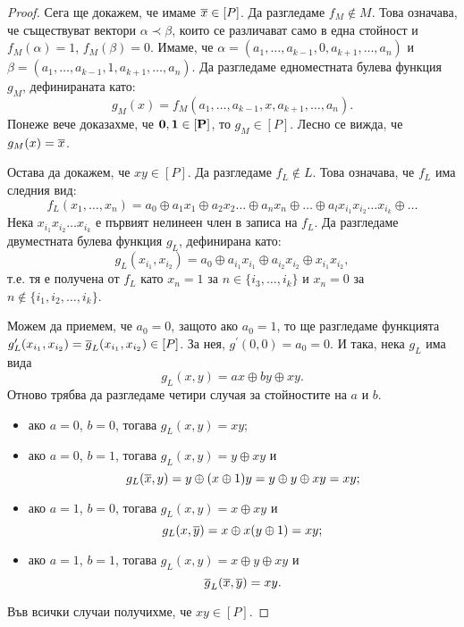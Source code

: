 \begin{proof}
  Сега ще докажем, че имаме $\overline{x} \in [P]$.
  Да разгледаме $f_M \not\in M$. Това означава, че съществуват вектори $\alpha  \prec \beta$, които се различават
  само в една стойност и $f_M(\alpha) = 1$, $f_M(\beta) = 0$.
  Имаме, че  $\alpha = (a_1,\dots,a_{k-1},0,a_{k+1},\dots,a_n)$ и $\beta = (a_1,\dots,a_{k-1},1,a_{k+1},\dots,a_n)$.
  Да разгледаме едноместната булева функция $g_M$, дефинираната като:
  \[g_M(x) = f_M(a_1,\dots,a_{k-1},x,a_{k+1},\dots,a_n).\]
  Понеже вече доказахме, че ${\bf 0},\bf{1} \in [P]$, то $g_M \in [P]$.
  Лесно се вижда, че $g_M(x) = \overline{x}$. 

  Остава да докажем, че $xy \in [P]$.
  Да разгледаме $f_L \not\in L$. Това означава, че $f_L$ има следния вид:
  \[f_L(x_1,\dots,x_n) = a_0 \oplus a_1x_1\oplus a_2x_2 \dots\oplus a_n x_n\oplus \dots \oplus a_lx_{i_1}x_{i_2}\dots x_{i_k}\oplus\dots \]
  Нека $x_{i_1}x_{i_2}\dots x_{i_k}$ е първият нелинеен член в записа на $f_L$.
  Да разгледаме двуместната булева функция $g_L$, дефинирана като:
  \[g_L(x_{i_1},x_{i_2}) = a_0 \oplus a_{i_1}x_{i_1} \oplus a_{i_2}x_{i_2} \oplus x_{i_1}x_{i_2},\]
  т.е. тя е получена от $f_L$ като $x_{n} = 1$ за $n \in \{i_3,\dots,i_k\}$ и $x_n = 0$ за $n \not\in\{i_1,i_2,\dots,i_k\}$.
  
  Можем да приемем, че $a_0 = 0$, защото ако $a_0 = 1$, то ще разгледаме функцията $g^\prime_L(x_{i_1},x_{i_2}) = \overline{g}_L(x_{i_1},x_{i_2}) \in [P]$.
  За нея, $g^\prime(0,0) = a_0 = 0$.
  И така, нека $g_L$ има вида
  \[g_L(x,y) = ax\oplus by \oplus xy.\]
  Отново трябва да разгледаме четири случая за стойностите на $a$ и $b$.
  \begin{itemize}
  \item 
    ако $a = 0$, $b = 0$, тогава $g_L(x,y) = xy$;
  \item 
    ако $a = 0$, $b = 1$, тогава $g_L(x,y) = y \oplus xy$ и 
    \[g_L(\overline{x},y) = y\oplus (x\oplus 1)y = y \oplus y \oplus xy = xy;\]
  \item 
    ако $a = 1$, $b = 0$, тогава $g_L(x,y) = x\oplus xy$ и
    \[g_L(x, \overline{y}) = x\oplus x(y\oplus 1) = xy;\]
  \item 
    ако $a = 1$, $b = 1$, тогава $g_L(x,y) = x \oplus y \oplus xy$ и
    \[\overline{g}_L(\overline{x},\overline{y}) = xy.\]
  \end{itemize}
  Във всички случаи получихме, че $xy \in [P]$.
\end{proof}

